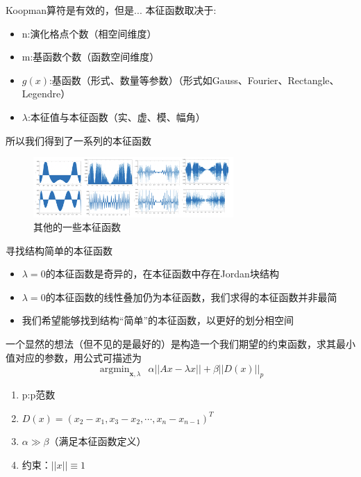 \documentclass{beamer}
\begin{document}
\begin{frame}{Koopman算符是有效的，但是...}
	本征函数取决于:
	\begin{itemize}
		\item n:演化格点个数（相空间维度）
		\item m:基函数个数（函数空间维度）
		\item $g(x)$:基函数（形式、数量等参数）（形式如Gauss、Fourier、Rectangle、Legendre）
		\item $\lambda$:本征值与本征函数（实、虚、模、幅角）
	\end{itemize}
	所以我们得到了一系列的本征函数
	\begin{figure}
		\centering
		\includegraphics[width=3in]{figure/logistic_eigen_problem}
		\caption{其他的一些本征函数}
	\end{figure}
\end{frame}

\begin{frame}{寻找结构简单的本征函数}
	\small
	\begin{itemize}
		\item $\lambda=0$的本征函数是奇异的，在本征函数中存在Jordan块结构
		\item $\lambda=0$的本征函数的线性叠加仍为本征函数，我们求得的本征函数并非最简
		\item 我们希望能够找到结构“简单”的本征函数，以更好的划分相空间
	\end{itemize}
	一个显然的想法（但不见的是最好的）是构造一个我们期望的约束函数，求其最小值对应的参数，用公式可描述为$$\mathop{\arg\min}_{\boldsymbol{x},\lambda} \ \ \alpha || Ax-\lambda x || + \beta ||D(x)||_p$$
	\begin{enumerate}
		\item p:p范数
		\item $D(x)=(x_2-x_1,x_3-x_2,\cdots,x_n-x_{n-1})^T$
		\item $\alpha \gg \beta$（满足本征函数定义）
		\item 约束：$||x||\equiv 1$
	\end{enumerate}
\end{frame}
\end{document}
